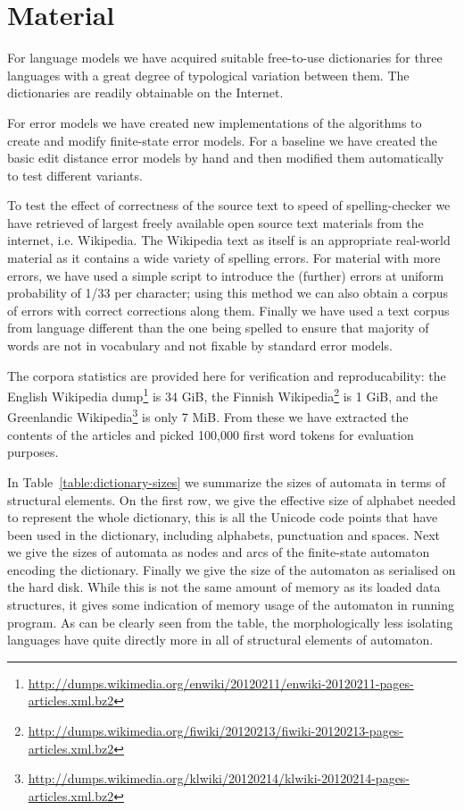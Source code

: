 \documentclass[11pt]{article}
\begin{document}
\section{Material}
\label{sec:materials}

For language models we have acquired suitable free-to-use
dictionaries for three languages with a great degree of
typological variation between them. The dictionaries
are readily obtainable on the Internet.

For error models we have created new implementations of the algorithms
to create and modify finite-state error models. For a baseline we have created
the basic edit distance error models by hand and then modified them
automatically to test different variants.

To test the effect of correctness of the source text to speed of
spelling-checker we have retrieved of largest freely available open source text
materials from the internet, i.e. Wikipedia. The Wikipedia text as itself is
an appropriate real-world material as it contains a wide variety of spelling
errors. For material with more errors, we have used a simple script to
introduce the (further) errors at uniform probability of 1/33 per character;
using this method we can also obtain a corpus of errors with correct
corrections along them. Finally we have used a text corpus from language
different than the one being spelled to ensure that majority of words are not
in vocabulary and not fixable by standard error models.

The corpora statistics are provided here for verification and reproducability:
the English Wikipedia
dump\footnote{\url{http://dumps.wikimedia.org/enwiki/20120211/enwiki-20120211-pages-articles.xml.bz2}}
is 34 GiB, the Finnish
Wikipedia\footnote{\url{http://dumps.wikimedia.org/fiwiki/20120213/fiwiki-20120213-pages-articles.xml.bz2}}
is 1 GiB, and the Greenlandic
Wikipedia\footnote{\url{http://dumps.wikimedia.org/klwiki/20120214/klwiki-20120214-pages-articles.xml.bz2}}
is only 7 MiB. From these we have extracted the contents of the articles and
picked 100,000 first word tokens for evaluation purposes.

In Table~\ref{table:dictionary-sizes} we summarize the sizes of automata in
terms of structural elements. On the first row, we give the effective size of
alphabet needed to represent the whole dictionary, this is all the Unicode
code points that have been used in the dictionary, including alphabets,
punctuation and spaces. Next we give the sizes of automata as nodes and
arcs of the finite-state automaton encoding the dictionary. Finally we give the
size of the automaton as serialised on the hard disk. While this is not the
same amount of memory as its loaded data structures, it gives some indication
of memory usage of the automaton in running program. As can be clearly
seen from the table, the morphologically less isolating languages have quite
directly more in all of structural elements of automaton.
\end{document}
